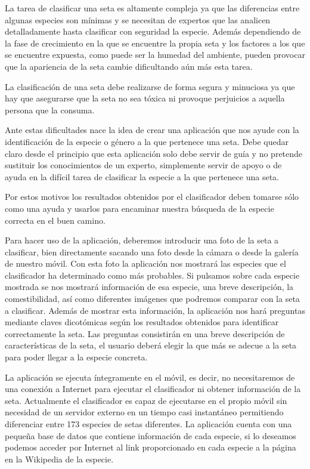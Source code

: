 
La tarea de clasificar una seta es altamente compleja ya que las diferencias entre algunas especies son mínimas y se necesitan de expertos que las analicen detalladamente hasta clasificar con seguridad la especie. Además dependiendo de la fase de crecimiento en la que se encuentre la propia seta y los factores a los que se encuentre expuesta, como puede ser la humedad del ambiente, pueden provocar que la apariencia de la seta cambie dificultando aún más esta tarea. 

La clasificación de una seta debe realizarse de forma segura y minuciosa ya que hay que asegurarse que la seta no sea tóxica ni provoque perjuicios a aquella persona que la consuma.

Ante estas dificultades nace la idea de crear una aplicación que nos ayude con la identificación de la especie o género a la que pertenece una seta. Debe quedar claro desde el principio que esta aplicación solo debe servir de guía y no pretende sustituir los conocimientos de un experto, simplemente servir de apoyo o de ayuda en la difícil tarea de clasificar la especie a la que pertenece una seta. 

Por estos motivos los resultados obtenidos por el clasificador deben tomarse sólo como una ayuda y usarlos para encaminar nuestra búsqueda de la especie correcta en el buen camino.

Para hacer uso de la aplicación, deberemos introducir una foto de la seta a clasificar, bien directamente sacando una foto desde la cámara o desde la galería de nuestro móvil. Con esta foto la aplicación nos mostrará las especies que el clasificador ha determinado como más probables. Si pulsamos sobre cada especie mostrada se nos mostrará información de esa especie, una breve descripción, la comestibilidad, así como diferentes imágenes que podremos comparar con la seta a clasificar. Además de mostrar esta información, la aplicación nos hará preguntas mediante claves dicotómicas según los resultados obtenidos para identificar correctamente la seta. Las preguntas consistirán en una breve descripción de características de la seta, el usuario deberá elegir la que más se adecue a la seta para poder llegar a la especie concreta.

La aplicación se ejecuta íntegramente en el móvil, es decir, no necesitaremos de una conexión a Internet para ejecutar el clasificador ni obtener información de la seta. Actualmente el clasificador es capaz de ejecutarse en el propio móvil sin necesidad de un servidor externo en un tiempo casi instantáneo permitiendo diferenciar entre 173 especies de setas diferentes. La aplicación cuenta con una pequeña base de datos que contiene información de cada especie, si lo deseamos podemos acceder por Internet al link proporcionado en cada especie a la página en la Wikipedia de la especie.